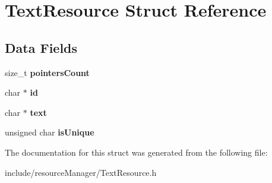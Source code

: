 \hypertarget{struct_text_resource}{}\section{Text\+Resource Struct Reference}
\label{struct_text_resource}
\subsection*{Data Fields}
\begin{DoxyCompactItemize}
\item 
\hypertarget{struct_text_resource_aa058e87a17f5f5079be31c1631ed5f50}{}\label{struct_text_resource_aa058e87a17f5f5079be31c1631ed5f50} 
size\+\_\+t {\bfseries pointers\+Count}
\item 
\hypertarget{struct_text_resource_aecb3b0d045ada529257a2fbf8f829599}{}\label{struct_text_resource_aecb3b0d045ada529257a2fbf8f829599} 
char $\ast$ {\bfseries id}
\item 
\hypertarget{struct_text_resource_a5633b1433389cec21ade3811bbe9ca5b}{}\label{struct_text_resource_a5633b1433389cec21ade3811bbe9ca5b} 
char $\ast$ {\bfseries text}
\item 
\hypertarget{struct_text_resource_a0473d732b3400461ba1f14e08fc16cd2}{}\label{struct_text_resource_a0473d732b3400461ba1f14e08fc16cd2} 
unsigned char {\bfseries is\+Unique}
\end{DoxyCompactItemize}


The documentation for this struct was generated from the following file\+:\begin{DoxyCompactItemize}
\item 
include/resource\+Manager/Text\+Resource.\+h\end{DoxyCompactItemize}
